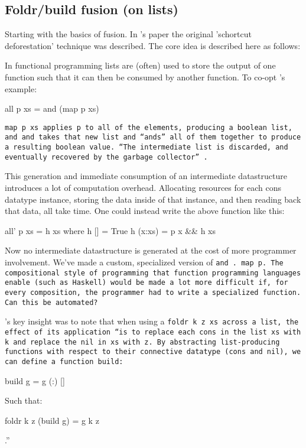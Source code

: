 \subsection{Foldr/build fusion (on lists)}\label{sec:foldr/build}
Starting with the basics of fusion. In \cite{Gill1993}'s paper the original 'schortcut deforestation' technique was described. The core idea is described here as follows:

In functional programming lists are (often) used to store the output of one function such that it can then be consumed by another function. To co-opt \cite{Gill1993}'s example:
\begin{code}
    all p xs = and (map p xs)
\end{code}

\tt{map p xs} applies \tt{p} to all of the elements, producing a boolean list, and \tt{and} takes that new list and ``ands'' all of them together to produce a resulting boolean value. ``The intermediate list is discarded, and eventually recovered by the garbage collector'' \citep{Gill1993}.

This generation and immediate consumption of an intermediate datastructure introduces a lot of computation overhead. Allocating resources for each cons datatype instance, storing the data inside of that instance, and then reading back that data, all take time. One could instead write the above function like this:
\begin{code}
    all' p xs = h xs
       where h []     = True
             h (x:xs) = p x && h xs
\end{code}
Now no intermediate datastructure is generated at the cost of more programmer involvement. We've made a custom, specialized version of \tt{and~.~map~p}. The compositional style of programming that function programming languages enable (such as Haskell) would be made a lot more difficult if, for every composition, the programmer had to write a specialized function. Can this be automated?

\cite{Gill1993}'s key insight was to note that when using a \tt{foldr k z xs} across a list, the effect of its application ``is to replace each \tt{cons} in the list \tt{xs} with k and replace the \tt{nil} in \tt{xs} with \tt{z}. By abstracting list-producing functions with respect to their connective datatype (\tt{cons} and \tt{nil}), we can define a function \tt{build}:
\begin{code}
    build g = g (:) []
\end{code}
Such that:
\begin{code}
    foldr k z (build g) = g k z
\end{code}
\cite{Gill1993}.''

